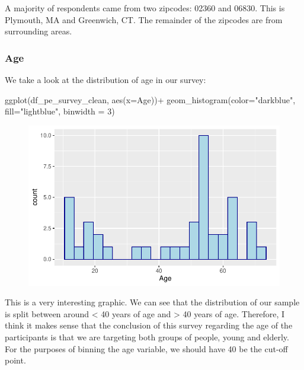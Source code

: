 \documentclass[
  letterpaper,
  DIV=11,
  numbers=noendperiod]{scrartcl}
\newenvironment{Shaded}{\begin{snugshade}}{\end{snugshade}}
\newcommand{\AttributeTok}[1]{\textcolor[rgb]{0.40,0.45,0.13}{#1}}
\newcommand{\DecValTok}[1]{\textcolor[rgb]{0.68,0.00,0.00}{#1}}
\newcommand{\FunctionTok}[1]{\textcolor[rgb]{0.28,0.35,0.67}{#1}}
\newcommand{\NormalTok}[1]{\textcolor[rgb]{0.00,0.23,0.31}{#1}}
\newcommand{\SpecialCharTok}[1]{\textcolor[rgb]{0.37,0.37,0.37}{#1}}
\newcommand{\StringTok}[1]{\textcolor[rgb]{0.13,0.47,0.30}{#1}}
\begin{document}
A majority of respondents came from two zipcodes: 02360 and 06830. This
is Plymouth, MA and Greenwich, CT. The remainder of the zipcodes are
from surrounding areas.

\hypertarget{age}{%
\subsubsection{Age}\label{age}}

We take a look at the distribution of age in our survey:

\begin{Shaded}
\begin{Highlighting}[]
\FunctionTok{ggplot}\NormalTok{(df\_pe\_survey\_clean, }\FunctionTok{aes}\NormalTok{(}\AttributeTok{x=}\NormalTok{Age))}\SpecialCharTok{+}
  \FunctionTok{geom\_histogram}\NormalTok{(}\AttributeTok{color=}\StringTok{"darkblue"}\NormalTok{, }\AttributeTok{fill=}\StringTok{"lightblue"}\NormalTok{, }\AttributeTok{binwidth =}  \DecValTok{3}\NormalTok{)}
\end{Highlighting}
\end{Shaded}

\begin{figure}[H]

{\centering \includegraphics{ytp_post_event_survey_files/figure-pdf/unnamed-chunk-6-1.pdf}

}

\end{figure}

This is a very interesting graphic. We can see that the distribution of
our sample is split between around \textless{} 40 years of age and
\textgreater{} 40 years of age. Therefore, I think it makes sense that
the conclusion of this survey regarding the age of the participants is
that we are targeting both groups of people, young and elderly. For the
purposes of binning the age variable, we should have 40 be the cut-off
point.
\end{document}
